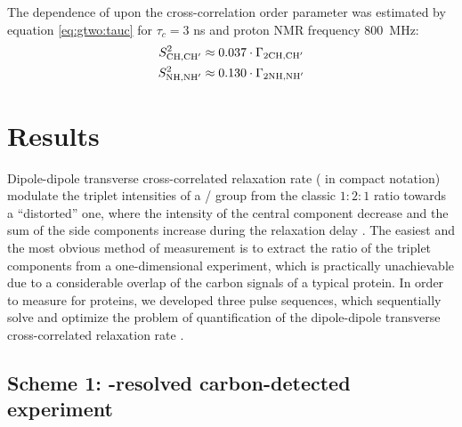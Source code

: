 \documentclass[twocolumn]{svjour3}           %
\begin{document}
The dependence 
of \gtwoCH{} upon the cross-correlation order parameter \StwoCHp{} was estimated 
by equation \eqref{eq:gtwo:tauc} for $\tau_c = 3$ ns and 
proton {NMR} frequency 800~MHz: 
\begin{align}
\label{eq:gapprox2}
     S^2_{\text{CH,CH}'}  & \approx 0.037 \cdot \Gamma_{\text{2CH,CH}'} \\
     S^2_{\text{NH,NH}'}  & \approx 0.130 \cdot \Gamma_{\text{2NH,NH}'}
\end{align}



\section{Results}
\label{results}
Dipole-dipole transverse cross-correlated relaxation rate \gtwoXH{} 
(\gtwo{} in compact notation) mo\-dulate the \nclab{}
triplet intensities of a \CHtwo/\NHtwo{} group from the classic $1:2:1$ 
ratio towards a \enquote{distorted} one, where the intensity of the central 
component decrease and the sum of the side components increase during the 
relaxation delay \cite{zheng_measurement_2004,yang_probing_2011}. The 
easiest and the most obvious method of \gtwo{} measurement is to extract 
the ratio of the triplet components from a one-dimensional \clab{} 
experiment, which is practically unachievable due to a considerable overlap 
of the carbon signals of a typical protein. In order to measure \gtwo{} 
for proteins, we developed three pulse se\-quen\-ces, which sequentially solve 
and optimize the problem of quantification of the dipole-dipole transverse 
cross-cor\-related relaxation rate \gtwo.

\subsection{Scheme 1: \oneJch-resolved carbon-detected experiment}
\label{subseq:scheme1}
\end{document}
